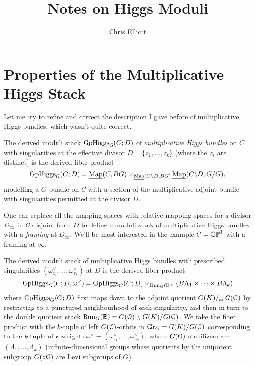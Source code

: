 \documentclass[10pt, oneside]{article}
\title{Notes on Higgs Moduli}
\author{Chris Elliott}
\newcommand{\map}{\underline{\mathrm{Map}}}
\begin{document}
\maketitle

\section{Properties of the Multiplicative Higgs Stack}
Let me try to refine and correct the description I gave before of multiplicative Higgs bundles, which wasn't quite correct.  

\begin{definition}
The derived moduli stack $\mathrm{GpHiggs}_G(C; D)$ of \emph{multiplicative Higgs bundles} on $C$ with singularities at the effective divisor $D = \{z_1, \ldots, z_k\}$ (where the $z_i$ are distinct) is the derived fiber product
\[\mr{GpHiggs}_G(C; D) = \map(C, BG) \times_{\map(C\backslash D, BG)} \map(C\backslash D, G/G),\]
modelling a $G$-bundle on $C$ with a section of the multiplicative adjoint bundle with singularities permitted at the divisor $D$.
\end{definition}

\begin{remark}
One can replace all the mapping spaces with relative mapping spaces for a divisor $D_\infty$ in $C$ disjoint from $D$ to define a moduli stack of multiplicative Higgs bundles with a \emph{framing} at $D_\infty$.  We'll be most interested in the example $C = \mathbb{CP}^1$ with a framing at $\infty$.
\end{remark}

\begin{definition} \label{mult_Higgs_def}
The derived moduli stack of multiplicative Higgs bundles with prescribed singularities $(\omega^\vee_{z_1}, \ldots, \omega^\vee_{z_k})$ at $D$ is the derived fiber product
\[\mathrm{GpHiggs}_G(C; D, \omega^\vee) = \mathrm{GpHiggs}_G(C; D) \times_{\operatorname{Bun}_G(\mathbb{B})^k} (B\Lambda_1 \times \cdots \times B\Lambda_k)\]
where $\mathrm{GpHiggs}_G(C; D)$ first maps down to the adjoint quotient $G(K) /_{\mathrm{ad}} G(\mathcal{O})$ by restricting to a punctured neighbourhood of each singularity, and then in turn to the double quotient stack $\operatorname{Bun}_G(\mathbb{B}) = G(\mathcal{O}) \ \backslash \  G(K) / G(\mathcal{O})$.  We take the fiber product with the $k$-tuple of left $G(\mathcal{O})$-orbits in $\operatorname{Gr}_G = G(K)/G(\mathcal{O})$ corresponding to the $k$-tuple of coweights $\omega^\vee = (\omega^\vee_{z_1}, \ldots, \omega^\vee_{z_k})$, whose $G(\mathcal{O})$-stabilizers are $(\Lambda_1, \ldots, \Lambda_k)$ (infinite-dimensional groups whose quotients by the unipotent subgroup $G(z\mathcal{O})$ are Levi subgroups of $G$). 
\end{definition}
\end{document}
